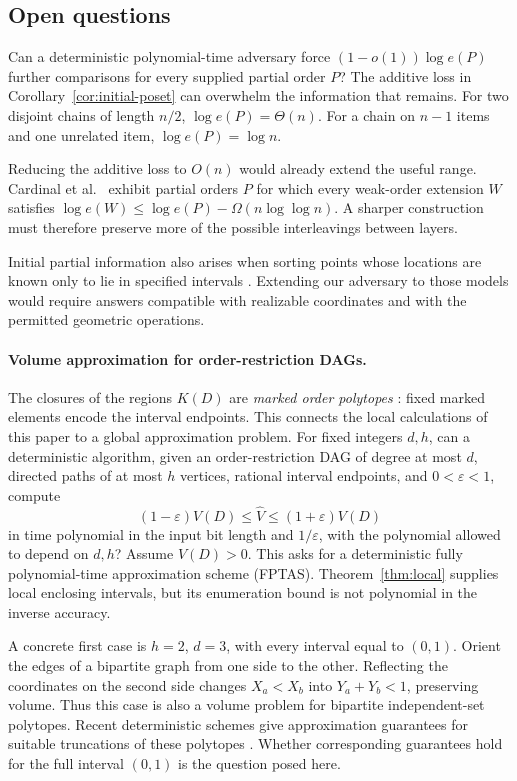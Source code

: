 \subsection{Open questions}

Can a deterministic polynomial-time adversary force
$(1-o(1))\log e(P)$ further comparisons for every supplied partial order
$P$? The additive loss in Corollary~\ref{cor:initial-poset} can overwhelm
the information that remains. For two disjoint chains of length $n/2$,
$\log e(P)=\Theta(n)$. For a chain on $n-1$ items and one unrelated item,
$\log e(P)=\log n$.

Reducing the additive loss to $O(n)$ would already extend the useful
range. Cardinal et al.~\cite[Section~4]{cardinal-production} exhibit
partial orders $P$ for which every weak-order extension $W$ satisfies
$\log e(W)\le\log e(P)-\Omega(n\log\log n)$. A sharper construction must
therefore preserve more of the possible interleavings between layers.

Initial partial information also arises when sorting points whose
locations are known only to lie in specified intervals
\cite{imprecise-points,interval-orders}. Extending our adversary to those
models would require answers compatible with realizable coordinates and
with the permitted geometric operations.

\paragraph{Volume approximation for order-restriction DAGs.}
The closures of the regions $K(D)$ are \emph{marked order polytopes}
\cite{marked-order-polytopes}: fixed marked elements encode the interval
endpoints. This connects the local calculations of this paper to a
global approximation problem. For fixed integers $d,h$, can a
deterministic algorithm, given an order-restriction DAG of degree at most
$d$, directed paths of at most $h$ vertices, rational interval endpoints,
and $0<\varepsilon<1$, compute
\[
(1-\varepsilon)V(D)\le\widehat V\le(1+\varepsilon)V(D)
\]
in time polynomial in the input bit length and $1/\varepsilon$, with
the polynomial allowed to depend on $d,h$?
Assume $V(D)>0$. This asks for a deterministic fully polynomial-time
approximation scheme (FPTAS). Theorem~\ref{thm:local} supplies local
enclosing intervals, but its enumeration bound is not polynomial in the
inverse accuracy.

A concrete first case is $h=2$, $d=3$, with every interval equal to
$(0,1)$. Orient the edges of a bipartite graph from one side to the other.
Reflecting the coordinates on the second side changes $X_a<X_b$ into
$Y_a+Y_b<1$, preserving volume. Thus this case is also a volume problem
for bipartite independent-set polytopes. Recent deterministic schemes
give approximation guarantees for suitable truncations of these polytopes
\cite{bencs-regts-volume}. Whether corresponding guarantees hold for the
full interval $(0,1)$ is the question posed here.

